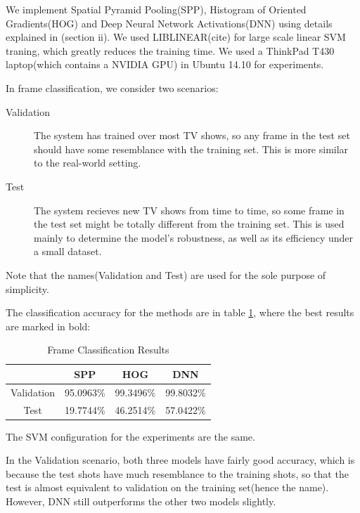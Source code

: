 \documentclass{article}
\begin{document}
  We implement Spatial Pyramid Pooling(SPP), Histogram of Oriented Gradients(HOG) and Deep Neural Network Activations(DNN) using details explained in (section ii). We used LIBLINEAR(cite) for large scale linear SVM traning, which greatly reduces the training time. We used a ThinkPad T430 laptop(which contains a NVIDIA GPU) in Ubuntu 14.10 for experiments.

  In frame classification, we consider two scenarios:

  \begin{description}
      \item[Validation] The system has trained over most TV shows, so any frame in the test set should have some resemblance with the training set. This is more similar to the real-world setting.
      \item[Test] The system recieves new TV shows from time to time, so some frame in the test set might be totally different from the training set. This is used mainly to determine the model's robustness, as well as its efficiency under a small dataset.
  \end{description}

  Note that the names(Validation and Test) are used for the sole purpose of simplicity.

  The classification accuracy for the methods are in table \ref{table:frame-classify}, where the best results are marked in bold:

  \begin{table}
      \begin{tabular}{cccc}
          \hline
                     & SPP       & HOG       & DNN \\\hline
          Validation & 95.0963\% & 99.3496\% & 99.8032\% \\\hline
          Test       & 19.7744\% & 46.2514\% & 57.0422\% \\\hline
      \end{tabular}
      \caption{Frame Classification Results}
      \label{table:frame-classify}
  \end{table}

  The SVM configuration for the experiments are the same.\par
  In the Validation scenario, both three models have fairly good accuracy, which is because the test shots have much resemblance to the training shots, so that the test is almost equivalent to validation on the training set(hence the name). However, DNN still outperforms the other two models slightly. 
\end{document}
